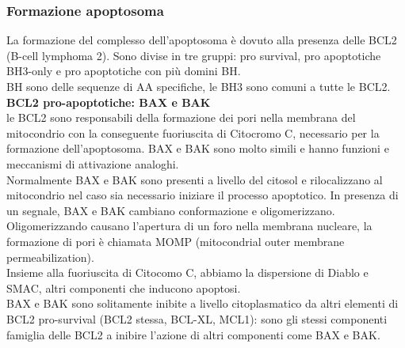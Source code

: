         \subsubsection{Formazione apoptosoma}
            La formazione del complesso dell'apoptosoma è dovuto alla presenza delle BCL2 (B-cell lymphoma 2). Sono divise in tre gruppi: pro survival, pro apoptotiche BH3-only e pro apoptotiche con più domini BH.\\
            BH sono delle sequenze di AA specifiche, le BH3 sono comuni a tutte le BCL2.\\
            
            \textbf{BCL2 pro-apoptotiche: BAX e BAK}\\
                le BCL2 sono responsabili della formazione dei pori nella membrana del mitocondrio con la conseguente fuoriuscita di Citocromo C, necessario per la formazione dell'apoptosoma. BAX e BAK sono molto simili e hanno funzioni e meccanismi di attivazione analoghi.\\
                Normalmente BAX e BAK sono presenti a livello del citosol e rilocalizzano al mitocondrio nel caso sia necessario iniziare il processo apoptotico. In presenza di un segnale, BAX e BAK cambiano conformazione e oligomerizzano. 
                Oligomerizzando causano l'apertura di un foro nella membrana nucleare, la formazione di pori è chiamata MOMP (mitocondrial outer membrane permeabilization).\\
                Insieme alla fuoriuscita di Citocomo C, abbiamo la dispersione di Diablo e SMAC, altri componenti che inducono apoptosi.\\
                BAX e BAK sono solitamente inibite a livello citoplasmatico da altri elementi di BCL2 pro-survival (BCL2 stessa, BCL-XL, MCL1): sono gli stessi componenti famiglia delle BCL2 a inibire l'azione di altri componenti come BAX e BAK.\\
            
